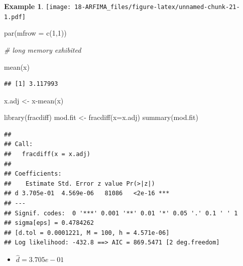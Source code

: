 \documentclass[
]{book}
\newenvironment{Shaded}{\begin{snugshade}}{\end{snugshade}}
\newcommand{\AttributeTok}[1]{\textcolor[rgb]{0.77,0.63,0.00}{#1}}
\newcommand{\CommentTok}[1]{\textcolor[rgb]{0.56,0.35,0.01}{\textit{#1}}}
\newcommand{\DecValTok}[1]{\textcolor[rgb]{0.00,0.00,0.81}{#1}}
\newcommand{\FunctionTok}[1]{\textcolor[rgb]{0.00,0.00,0.00}{#1}}
\newcommand{\NormalTok}[1]{#1}
\newcommand{\OtherTok}[1]{\textcolor[rgb]{0.56,0.35,0.01}{#1}}
\newcommand{\SpecialCharTok}[1]{\textcolor[rgb]{0.00,0.00,0.00}{#1}}
\providecommand{\tightlist}{%
  \setlength{\itemsep}{0pt}\setlength{\parskip}{0pt}}
\theoremstyle{definition}
\theoremstyle{definition}
\newtheorem{example}{Example}[chapter]
\theoremstyle{definition}
\theoremstyle{definition}
\theoremstyle{remark}
\begin{document}
\begin{example}
\texttt{[image: 18-ARFIMA\_files/figure-latex/unnamed-chunk-21-1.pdf]}

\begin{Shaded}
\begin{Highlighting}[]
\FunctionTok{par}\NormalTok{(}\AttributeTok{mfrow =} \FunctionTok{c}\NormalTok{(}\DecValTok{1}\NormalTok{,}\DecValTok{1}\NormalTok{))}

\CommentTok{\# long memory exhibited}
\end{Highlighting}
\end{Shaded}

\begin{Shaded}
\begin{Highlighting}[]
\FunctionTok{mean}\NormalTok{(x)}
\end{Highlighting}
\end{Shaded}

\begin{verbatim}
## [1] 3.117993
\end{verbatim}

\begin{Shaded}
\begin{Highlighting}[]
\NormalTok{x.adj }\OtherTok{\textless{}{-}}\NormalTok{ x}\SpecialCharTok{{-}}\FunctionTok{mean}\NormalTok{(x)}
\end{Highlighting}
\end{Shaded}

\begin{Shaded}
\begin{Highlighting}[]
\FunctionTok{library}\NormalTok{(fracdiff)}
\NormalTok{mod.fit }\OtherTok{\textless{}{-}} \FunctionTok{fracdiff}\NormalTok{(}\AttributeTok{x=}\NormalTok{x.adj)}
\FunctionTok{summary}\NormalTok{(mod.fit)}
\end{Highlighting}
\end{Shaded}

\begin{verbatim}
## 
## Call:
##   fracdiff(x = x.adj) 
## 
## Coefficients:
##    Estimate Std. Error z value Pr(>|z|)    
## d 3.705e-01  4.569e-06   81086   <2e-16 ***
## ---
## Signif. codes:  0 '***' 0.001 '**' 0.01 '*' 0.05 '.' 0.1 ' ' 1
## sigma[eps] = 0.4784262 
## [d.tol = 0.0001221, M = 100, h = 4.571e-06]
## Log likelihood: -432.8 ==> AIC = 869.5471 [2 deg.freedom]
\end{verbatim}

\begin{itemize}
\tightlist
\item
  \(\hat d=3.705e-01\)
\end{itemize}


\end{example}
\end{document}
